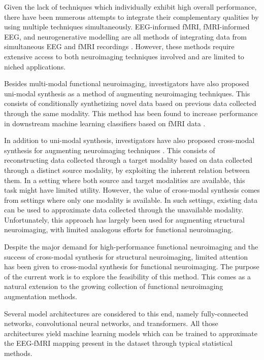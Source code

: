 \documentclass{article}
\begin{document}
Given the lack of techniques which individually exhibit high overall performance, there have been numerous attempts to integrate their complementary qualities by using multiple techniques simultaneously. EEG-informed fMRI, fMRI-informed EEG, and neurogenerative modelling are all methods of integrating data from simultaneous EEG and fMRI recordings \cite{huster_methods_2012}. However, these methods require extensive access to both neuroimaging techniques involved and are limited to niched applications. 

Besides multi-modal functional neuroimaging, investigators have also proposed uni-modal synthesis as a method of augmenting neuroimaging techniques. This consists of conditionally synthetizing novel data based on previous data collected through the same modality. This method has been found to increase performance in downstream machine learning classifiers based on fMRI data \cite{zhuang_fmri_2019}.

In addition to uni-modal synthesis, investigators have also proposed cross-modal synthesis for augmenting neuroimaging techniques \cite{yi_generative_2019}. This consists of reconstructing data collected through a target modality based on data collected through a distinct source modality, by exploiting the inherent relation between them. In a setting where both source and target modalities are available, this task might have limited utility. However, the value of cross-modal synthesis comes from settings where only one modality is available. In such settings, existing data can be used to approximate data collected through the unavailable modality. Unfortunately, this approach has largely been used for augmenting structural neuroimaging, with limited analogous efforts for functional neuroimaging.

Despite the major demand for high-performance functional neuroimaging and the success of cross-modal synthesis for structural neuroimaging, limited attention has been given to cross-modal synthesis for functional neuroimaging. The purpose of the current work is to explore the feasibility of this method. This comes as a natural extension to the growing collection of functional neuroimaging augmentation methods.

Several model architectures are considered to this end, namely fully-connected networks, convolutional neural networks, and transformers. All those architectures yield machine learning models which can be trained to approximate the EEG-fMRI mapping present in the dataset through typical statistical methods. 
\end{document}
